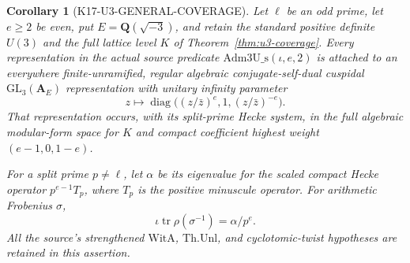 \documentclass[11pt,a4paper]{article}
\newtheorem{corollary}[theorem]{Corollary}
\theoremstyle{definition}
\begin{document}
\begin{corollary}[K17-U3-GENERAL-COVERAGE]
\label{cor:u3-general-coverage}
Let $\ell$ be an odd prime, let $e\ge2$ be even, put
$E=\mathbf Q(\sqrt{-3})$, and retain the standard
positive definite $U(3)$ and the full lattice level $K$ of
Theorem~\ref{thm:u3-coverage}. Every representation in the actual source
predicate $\mathrm{Adm3U\_s}(\iota,e,2)$ is attached to an everywhere
finite-unramified, regular algebraic conjugate-self-dual cuspidal
$\mathrm{GL}_3(\mathbf A_E)$ representation with unitary infinity
parameter
\[
 z\longmapsto
 \operatorname{diag}\bigl((z/\bar z)^e,1,(z/\bar z)^{-e}\bigr).
\]
That representation occurs, with its split-prime Hecke system, in the
full algebraic modular-form space for $K$ and compact coefficient
highest weight $(e-1,0,1-e)$.

For a split prime $p\ne\ell$, let $\alpha$ be its eigenvalue for the
scaled compact Hecke operator $p^{e-1}T_p$, where $T_p$ is the positive
minuscule operator. For arithmetic Frobenius $\sigma$,
\[
 \iota\operatorname{tr}\rho(\sigma^{-1})=\alpha/p^e.
 \tag{U1}
\]
All the source's strengthened $\mathrm{WitA}$, $\mathrm{Th.Unl}$, and
cyclotomic-twist hypotheses are retained in this assertion.
\end{corollary}
\end{document}

